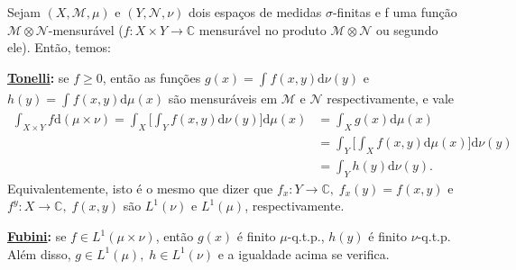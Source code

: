 \documentclass[../distribution_theory_notes.tex]{subfiles}
\begin{document}
\begin{tcolorbox}[
       skin=enhanced,
       title=Lembrete!,
       after title={\hfill Fubini-Tonelli},
       fonttitle=\bfseries,
       sharp corners=downhill,
     colframe=black,
       colbacktitle=yellow!75!white, 
       colback=yellow!30,
       colbacklower=black,
     coltitle=black,
       drop large lifted shadow
       ]
       \hypertarget{fubini_tonelli}{ 
         \begin{theorem*}
          Sejam \((X, \mathcal{M}, \mu )\) e \((Y, \mathcal{N}, \nu)\) dois espaços de medidas \(\sigma \)-finitas e f uma função \( \mathcal{M} \otimes \mathcal{N}\)-mensurável (\(f:X\times Y\rightarrow \mathbb{C}\) mensurável no produto \(\mathcal{M}\otimes \mathcal{N}\) ou segundo ele). Então, temos: 

          \textbf{\underline{Tonelli}:} se \(f\geq 0\), então as funções \(g(x)=\int_{}^{}f(x, y) \mathrm{d}\nu(y)\) e \(h(y)=\int_{}^{}f(x, y) \mathrm{d}\mu(x)\) são mensuráveis em \(\mathcal{M}\) e \(\mathcal{N}\) respectivamente, e vale 
         \begin{align*}
           \int_{X\times Y}^{}f \mathrm{d}(\mu \times \nu ) = \int_{X}^{}\biggl[\int_{Y}^{}f(x, y) \mathrm{d}\nu (y)\biggr] \mathrm{d}\mu(x)&= \int_{X}^{}g(x) \mathrm{d}\mu (x)\\ 
                                                                                                                                            &= \int_{Y}^{}\biggl[\int_{X}^{}f(x, y) \mathrm{d}\mu (x)\biggr] \mathrm{d}\nu(y)\\ 
                                                                                                                                            &= \int_{Y}^{}h(y) \mathrm{d}\nu (y).
                                                                                                                                                                  
         \end{align*} 
         Equivalentemente, isto é o mesmo que dizer que \(f_x:Y\rightarrow \mathbb{C},\; f_x(y)=f(x, y)\) e \(f^{y}:X\rightarrow \mathbb{C},\; f(x, y)\) são \(L^{1}(\nu )\) e \(L^{1}(\mu )\), respectivamente.

         \textbf{\underline{Fubini}:} se \(f\in L^{1}(\mu \times \nu )\), então \(g(x)\) é finito \(\mu\)-q.t.p., \(h(y)\) é finito \(\nu\)-q.t.p. Além disso, \(g\in L^{1}(\mu ),\; h\in L^{1}(\nu )\) e a igualdade acima se verifica.
     \end{theorem*} }
       \end{tcolorbox}
\end{document}
